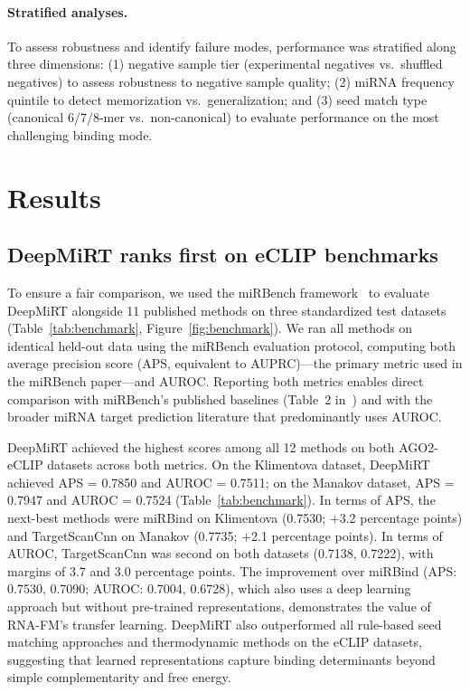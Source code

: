 \documentclass[10pt,a4paper]{article}
\begin{document}
\paragraph{Stratified analyses.} To assess robustness and identify failure modes, performance was stratified along three dimensions: (1) negative sample tier (experimental negatives vs.\ shuffled negatives) to assess robustness to negative sample quality; (2) miRNA frequency quintile to detect memorization vs.\ generalization; and (3) seed match type (canonical 6/7/8-mer vs.\ non-canonical) to evaluate performance on the most challenging binding mode.

\section{Results}

\subsection{DeepMiRT ranks first on eCLIP benchmarks}

To ensure a fair comparison, we used the miRBench framework~\citep{sammut2025mirbench} to evaluate DeepMiRT alongside 11 published methods on three standardized test datasets (Table~\ref{tab:benchmark}, Figure~\ref{fig:benchmark}). We ran all methods on identical held-out data using the miRBench evaluation protocol, computing both average precision score (APS, equivalent to AUPRC)---the primary metric used in the miRBench paper---and AUROC. Reporting both metrics enables direct comparison with miRBench's published baselines (Table~2 in~\citet{sammut2025mirbench}) and with the broader miRNA target prediction literature that predominantly uses AUROC.

DeepMiRT achieved the highest scores among all 12 methods on both AGO2-eCLIP datasets across both metrics. On the Klimentova dataset, DeepMiRT achieved APS = 0.7850 and AUROC = 0.7511; on the Manakov dataset, APS = 0.7947 and AUROC = 0.7524 (Table~\ref{tab:benchmark}). In terms of APS, the next-best methods were miRBind on Klimentova (0.7530; $+$3.2 percentage points) and TargetScanCnn on Manakov (0.7735; $+$2.1 percentage points). In terms of AUROC, TargetScanCnn was second on both datasets (0.7138, 0.7222), with margins of 3.7 and 3.0 percentage points. The improvement over miRBind (APS: 0.7530, 0.7090; AUROC: 0.7004, 0.6728), which also uses a deep learning approach but without pre-trained representations, demonstrates the value of RNA-FM's transfer learning. DeepMiRT also outperformed all rule-based seed matching approaches and thermodynamic methods on the eCLIP datasets, suggesting that learned representations capture binding determinants beyond simple complementarity and free energy.
\end{document}
